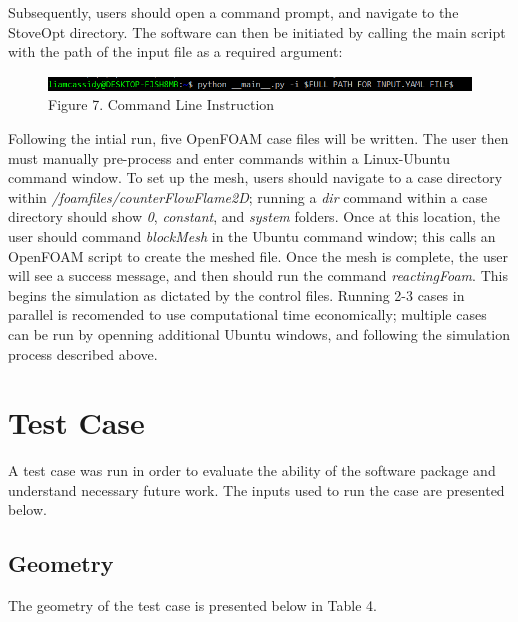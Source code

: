 \documentclass[3p,times,twocolumn]{elsarticle}
\begin{document}
Subsequently, users should open a command prompt, and navigate to the StoveOpt directory. The software can then be initiated by calling the main script with the path of the input file as a required argument:

\begin{figure}{\linewidth}
	\includegraphics[width=\linewidth]{commandline.PNG}
	\caption{Figure 7. Command Line Instruction}
\end{figure}

Following the intial run, five OpenFOAM case files will be written. The user then must manually pre-process and enter commands within a Linux-Ubuntu command window. To set up the mesh, users should navigate to a case directory within \textit{/foamfiles/counterFlowFlame2D}; running a \textit{dir} command within a case directory should show \textit{0}, \textit{constant}, and \textit{system} folders. Once at this location, the user should command \textit{blockMesh} in the Ubuntu command window; this calls an OpenFOAM script to create the meshed file. Once the mesh is complete, the user will see a success message, and then should run the command \textit{reactingFoam}. This begins the simulation as dictated by the control files. Running 2-3 cases in parallel is recomended to use computational time economically; multiple cases can be run by openning additional Ubuntu windows, and following the simulation process described above. 
\section{Test Case}
A test case was run in order to evaluate the ability of the software package and understand necessary future work. The inputs used to run the case are presented below.

\subsection{Geometry}

The geometry of the test case is presented below in Table 4.
\newline
\newline
\end{document}
